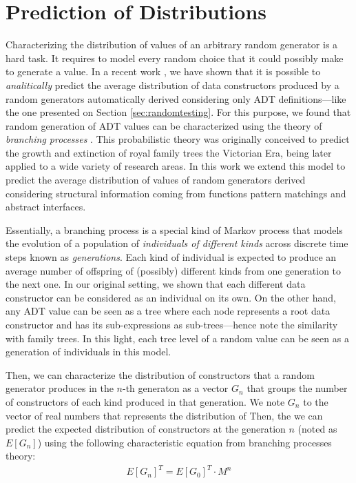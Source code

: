 \section{Prediction of Distributions} \label{sec:synthesis}

Characterizing the distribution of values of an arbitrary random generator is a
hard task.
%
It requires to model every random choice that it could possibly make to generate
a value.
%
In a recent work \tocite, we have shown that it is possible to
\emph{analitically} predict the average distribution of data constructors
produced by a random generators automatically derived considering only ADT
definitions---like the one presented on Section \ref{sec:randomtesting}.
%
For this purpose, we found that random generation of ADT values can be
characterized using the theory of \emph{branching processes} \tocite.
%
This probabilistic theory was originally conceived to predict the growth and
extinction of royal family trees the Victorian Era, being later applied to a
wide variety of research areas.
%
In this work we extend this model to predict the average distribution of values
of random generators derived considering structural information coming from
functions pattern matchings and abstract interfaces.


Essentially, a branching process is a special kind of Markov process that models
the evolution of a population of \emph{individuals of different kinds} across
discrete time steps known as \emph{generations}.
%
Each kind of individual is expected to produce an average number of offspring of
(possibly) different kinds from one generation to the next one.
%
In our original setting, we shown that each different data constructor can be
considered as an individual on its own.
%
On the other hand, any ADT value can be seen as a tree where each node
represents a root data constructor and has its sub-expressions as
sub-trees---hence note the similarity with family trees.
%
In this light, each tree level of a random value can be seen as a generation of
individuals in this model.


Then, we can characterize the distribution of constructors that a random
generator produces in the $n$-th generaton as a vector $G_n$ that groups the
number of constructors of each kind produced in that generation.
We note $G_n$ to the vector of real numbers that represents the distribution of
%
Then, the we can predict the expected distribution of constructors at the
generation $n$ (noted as $E[G_n]$) using the following characteristic equation
from branching processes theory:
%
\begin{align}
  E[G_n]^T = E[G_0]^T \cdot M^n
  \label{eqn:prediction}
\end{align}

